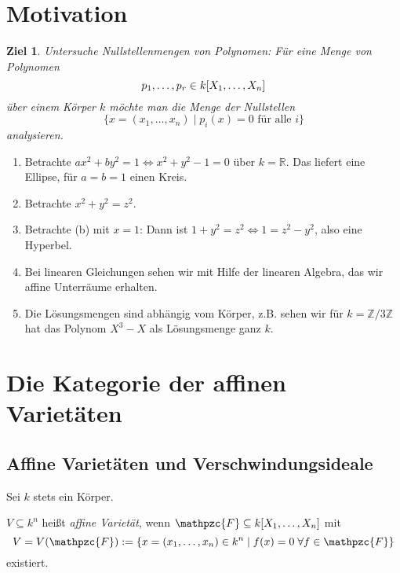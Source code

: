 \documentclass[a4paper,12pt]{scrbook}
\theoremstyle{blah}
\newtheorem*{ziel}{Ziel}
\theoremstyle{stz}
\newcommand{\F}{\mathpzc{F}}
\newcommand{\set}[1]{\ensuremath{\mathbb{#1}}}
\newcommand{\R}{\set{R}}
\newcommand{\Z}{\set{Z}}
\newcommand{\polyx}{\ensuremath%
  [X_{1},\dotsc,X_{n}]}
\begin{document}

\chapter*{Motivation}

\begin{ziel}
Untersuche Nullstellenmengen von Polynomen: Für eine Menge von Polynomen
\[p_{1},\dotsc,p_{r}\in k\polyx\]
über einem Körper $k$ möchte man die Menge der Nullstellen
\[\{x=(x_{1},\dotsc,x_{n})\mid p_{i}(x)=0\text{ für alle }i\}\]
analysieren.
\end{ziel}

\begin{bsp*}
\begin{enumerate}
\item Betrachte $ax^{2}+by^{2}=1\iff x^{2}+y^{2}-1=0$ über $k=\R$. Das liefert eine Ellipse, für $a=b=1$ einen Kreis.
\item Betrachte $x^{2}+y^{2}=z^{2}$.
\item Betrachte (b) mit $x=1$: Dann ist $1+y^{2}=z^{2}\iff 1=z^{2}-y^{2}$, also eine Hyperbel.
\item Bei linearen Gleichungen sehen wir mit Hilfe der linearen Algebra, das wir affine Unterräume erhalten.
\item Die Lösungsmengen sind abhängig vom Körper, z.B. sehen wir für $k=\Z/3\Z$ hat das Polynom $X^{3}-X$ als Lösungsmenge ganz $k$.
\end{enumerate}
\end{bsp*}


\chapter{Die Kategorie der affinen Varietäten}
\section{Affine Varietäten und Verschwindungsideale}

Sei $k$ stets ein Körper.

\begin{dfn}
$V\subseteq k^{n}$ heißt \emph{affine Varietät}, wenn
$\F\subseteq k\polyx$
mit \[V=V(\F):=\{x=(x_{1},\dotsc,x_{n})\in k^{n}\mid f(x)=0\;\forall f\in\F\}\] existiert.
\end{dfn}
\end{document}
